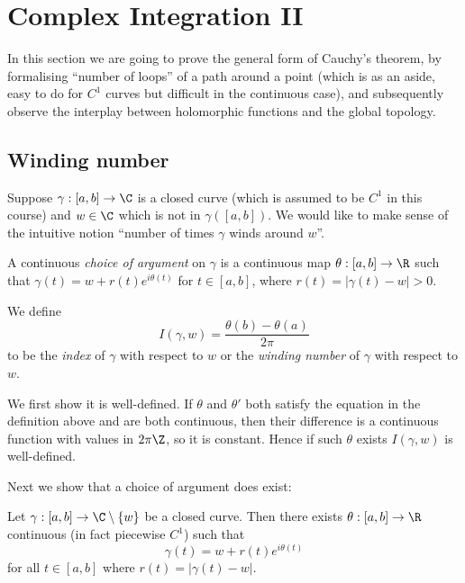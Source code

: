 \documentclass[a4paper]{article}
\begin{document}
\section{Complex Integration II}

In this section we are going to prove the general form of Cauchy's theorem, by formalising ``number of loops'' of a path around a point (which is as an aside, easy to do for \(C^1\) curves but difficult in the continuous case), and subsequently observe the interplay between holomorphic functions and the global topology.

\subsection{Winding number}

Suppose \(\gamma: [a, b] \to \C\) is a closed curve (which is assumed to be \(C^1\) in this course) and \(w \in \C\) which is not in \(\gamma([a, b])\). We would like to make sense of the intuitive notion ``number of times \(\gamma\) winds around \(w\)''.

\begin{definition}
  A continuous \emph{choice of argument} on \(\gamma\) is a continuous map \(\theta: [a, b] \to \R\) such that \(\gamma(t) = w + r(t)e^{i\theta(t)}\) for \(t \in [a, b]\), where \(r(t) = |\gamma(t) - w| > 0\).
\end{definition}

\begin{definition}
  We define
  \[
    I(\gamma, w) = \frac{\theta(b) - \theta(a)}{2\pi}
  \]
  to be the \emph{index} of \(\gamma\) with respect to \(w\) or the \emph{winding number} of \(\gamma\) with respect to \(w\).
\end{definition}

We first show it is well-defined. If \(\theta\) and \(\theta'\) both satisfy the equation in the definition above and are both continuous, then their difference is a continuous function with values in \(2\pi\Z\), so it is constant. Hence if such \(\theta\) exists \(I(\gamma, w)\) is well-defined.

Next we show that a choice of argument does exist:

\begin{lemma}
  Let \(\gamma: [a, b] \to \C \setminus \{w\}\) be a closed curve. Then there exists \(\theta: [a, b] \to \R\) continuous (in fact piecewise \(C^1\)) such that
  \[
    \gamma(t) = w + r(t) e^{i\theta(t)}
  \]
  for all \(t \in [a, b]\) where \(r(t) = |\gamma(t) - w|\).
\end{lemma}
\end{document}
